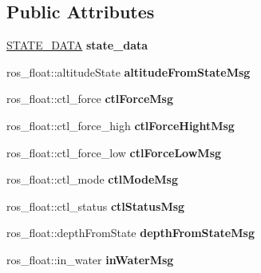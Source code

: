 \subsection*{Public Attributes}
\begin{DoxyCompactItemize}
\item 
\mbox{\label{classSTATE__reader_a4edbaa8ea1d2c7fb2fef27797dc45a50}} 
\hyperlink{structSTATE__DATA}{S\+T\+A\+T\+E\+\_\+\+D\+A\+TA} {\bfseries state\+\_\+data}
\item 
\mbox{\label{classSTATE__reader_a8d0e7b4ac753fa3e0bbbb891de83abfe}} 
ros\+\_\+float\+::altitude\+State {\bfseries altitude\+From\+State\+Msg}
\item 
\mbox{\label{classSTATE__reader_a9077b1dbc8ceb7363812334d3da43d29}} 
ros\+\_\+float\+::ctl\+\_\+force {\bfseries ctl\+Force\+Msg}
\item 
\mbox{\label{classSTATE__reader_a42ac50d81050a09f1f932e04b321e3bc}} 
ros\+\_\+float\+::ctl\+\_\+force\+\_\+high {\bfseries ctl\+Force\+Hight\+Msg}
\item 
\mbox{\label{classSTATE__reader_ad5600aac8ba36aa41cb6bfa0a91621ab}} 
ros\+\_\+float\+::ctl\+\_\+force\+\_\+low {\bfseries ctl\+Force\+Low\+Msg}
\item 
\mbox{\label{classSTATE__reader_a83b57bc0d2ffa8d166cddceeb45bb820}} 
ros\+\_\+float\+::ctl\+\_\+mode {\bfseries ctl\+Mode\+Msg}
\item 
\mbox{\label{classSTATE__reader_a6176f057dced1febe1d199f965632c27}} 
ros\+\_\+float\+::ctl\+\_\+status {\bfseries ctl\+Status\+Msg}
\item 
\mbox{\label{classSTATE__reader_af54392524bbc9d255f56245a01ba1d17}} 
ros\+\_\+float\+::depth\+From\+State {\bfseries depth\+From\+State\+Msg}
\item 
\mbox{\label{classSTATE__reader_af245fa22b9eddb4980ffc95651ea4800}} 
ros\+\_\+float\+::in\+\_\+water {\bfseries in\+Water\+Msg}
\item 
\mbox{\label{classSTATE__reader_a93364eba6232b52e190f40dfa24dc7ce}} 

\end{DoxyCompactItemize}
